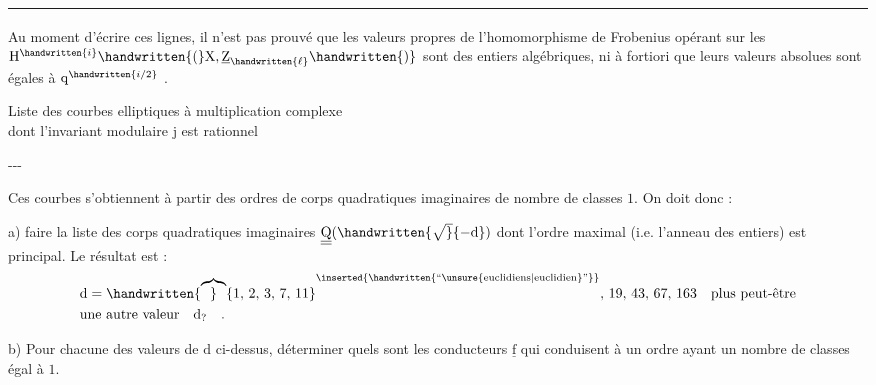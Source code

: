 \begin{minipage}{\linewidth}
\smallskip
\noindent\rule{0.32\linewidth}{0.4pt}\par
{\footnotesize\noindent\textsuperscript{}\quad Au moment d'écrire ces lignes, il n'est pas prouvé que les valeurs propres de l'homomorphisme de Frobenius opérant sur les $\mathrm{H}^{\handwritten{i}}\handwritten{(}\mathrm{X},\underline{\mathrm{Z}}_{\handwritten{\ell}}\handwritten{)}$ sont des entiers algébriques, ni à fortiori que leurs valeurs absolues sont égales à $\mathrm{q}^{\handwritten{i/2}}$ .\par}
\end{minipage}
\clearpage
{}
\reversemarginpar
{}
\normalmarginpar
{}

\begin{center}
Liste des courbes elliptiques à multiplication complexe\\
dont l'invariant modulaire $\mathrm{j}$ est rationnel

\medskip
-{}-{}-
\end{center}

Ces courbes s'obtiennent à partir des ordres de corps quadratiques imaginaires de nombre de classes $1$. On doit donc :

a) faire la liste des corps quadratiques imaginaires $\underline{\underline{\mathrm{Q}}}(\handwritten{\sqrt}{-\mathrm{d}})$ dont l'ordre maximal (i.e. l'anneau des entiers) est principal. Le résultat est :
\reversemarginpar
{}
\normalmarginpar
\[
\begin{aligned}
&\mathrm{d} = \handwritten{\overbrace}{1,\,2,\,3,\,7,\,11}^{\inserted{\handwritten{\text{``\unsure{euclidiens|euclidien}''}}}},\,19,\,43,\,67,\,163 \quad \text{plus peut-être}\\
&\text{une autre valeur}\quad \mathrm{d}_{?}\quad .
\end{aligned}
\]

b) Pour chacune des valeurs de $\mathrm{d}$ ci-dessus, déterminer quels sont les conducteurs $\underline{\mathrm{f}}$ qui conduisent à un ordre ayant un nombre de classes égal à $1$.

